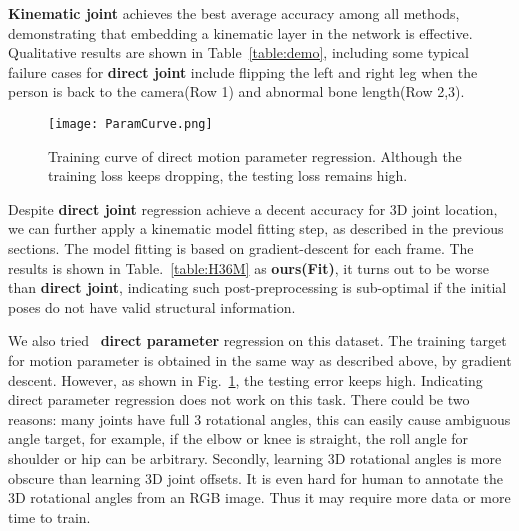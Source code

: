 \documentclass[runningheads]{llncs}
\begin{document}
\textbf{Kinematic joint} achieves the best average accuracy among all methods, demonstrating that embedding a kinematic layer in the network is effective. Qualitative results are shown in Table~\ref{table:demo}, including some typical failure cases for \textbf{direct joint} include flipping the left and right leg when the person is back to the camera(Row 1) and abnormal bone length(Row 2,3).

\begin{figure}
\begin{center}
\texttt{[image: ParamCurve.png]}
\end{center}
   \caption{Training curve of direct motion parameter regression. Although the training loss keeps dropping, the testing loss remains high. }
\label{fig:paramcurve}
\end{figure}

Despite \textbf{direct joint} regression achieve a decent accuracy for 3D joint location, we can further apply a kinematic model fitting step, as described in the previous sections. The model fitting is based on gradient-descent for each frame. The results is shown in Table.~\ref{table:H36M} as \textbf{ours(Fit)}, it turns out to be worse than \textbf{direct joint}, indicating such post-preprocessing is sub-optimal if the initial poses do not have valid structural information.

We also tried ~\textbf{direct parameter} regression on this dataset. The training target for motion parameter is obtained in the same way as described above, by gradient descent. However, as shown in Fig.~\ref{fig:paramcurve}, the testing error keeps high. Indicating direct parameter regression does not work on this task. There could be two reasons: many joints have full 3 rotational angles, this can easily cause ambiguous angle target, for example, if the elbow or knee is straight, the roll angle for shoulder or hip can be arbitrary. Secondly, learning 3D rotational angles is more obscure than learning 3D joint offsets. It is even hard for human to annotate the 3D rotational angles from an RGB image. Thus it may require more data or more time to train.
\end{document}
